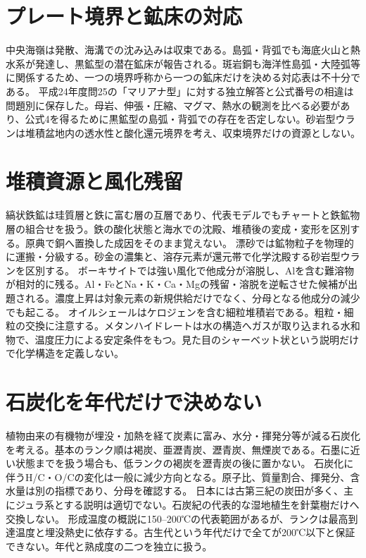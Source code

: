 \section{プレート境界と鉱床の対応}\label{theory:ore:tectonic}
中央海嶺は発散、海溝での沈み込みは収束である\cite{usgs_plate_boundaries}。島弧・背弧でも海底火山と熱水系が発達し、黒鉱型の潜在鉱床が報告される\cite{ore50_backarc_ref}。斑岩銅も海洋性島弧・大陸弧等に関係するため、一つの境界呼称から一つの鉱床だけを決める対応表は不十分である。
平成24年度問25の「マリアナ型」に対する独立解答と公式番号の相違は問題別に保存した。母岩、伸張・圧縮、マグマ、熱水の観測を比べる必要があり、公式4を得るために黒鉱型の島弧・背弧での存在を否定しない。砂岩型ウランは堆積盆地内の透水性と酸化還元境界を考え、収束境界だけの資源としない。

\section{堆積資源と風化残留}\label{theory:ore:sedimentary}
縞状鉄鉱は珪質層と鉄に富む層の互層であり、代表モデルでもチャートと鉄鉱物層の組合せを扱う\cite{ore50_bif_ref}。鉄の酸化状態と海水での沈殿、堆積後の変成・変形を区別する。原典で銅へ置換した成因をそのまま覚えない。
漂砂では鉱物粒子を物理的に運搬・分級する。砂金の濃集と、溶存元素が還元帯で化学沈殿する砂岩型ウランを区別する。
ボーキサイトでは強い風化で他成分が溶脱し、Alを含む難溶物が相対的に残る\cite{ore50_bauxite_ref}。Al・FeとNa・K・Ca・Mgの残留・溶脱を逆転させた候補が出題される。濃度上昇は対象元素の新規供給だけでなく、分母となる他成分の減少でも起こる。
オイルシェールはケロジェンを含む細粒堆積岩である\cite{ore50_oilshale_ref}。粗粒・細粒の交換に注意する。メタンハイドレートは水の構造へガスが取り込まれる水和物で、温度圧力による安定条件をもつ。見た目のシャーベット状という説明だけで化学構造を定義しない。

\section{石炭化を年代だけで決めない}\label{theory:ore:coal}
植物由来の有機物が埋没・加熱を経て炭素に富み、水分・揮発分等が減る石炭化を考える。基本のランク順は褐炭、亜瀝青炭、瀝青炭、無煙炭である\cite{ore50_coal_ref}。石墨に近い状態までを扱う場合も、低ランクの褐炭を瀝青炭の後に置かない。
石炭化に伴うH/C・O/Cの変化は一般に減少方向となる。原子比、質量割合、揮発分、含水量は別の指標であり、分母を確認する。
日本には古第三紀の炭田が多く、主にジュラ系とする説明は適切でない\cite{ore50_japan_coal_ref}。石炭紀の代表的な湿地植生を針葉樹だけへ交換しない。
形成温度の概説に150--200℃の代表範囲があるが、ランクは最高到達温度と埋没熱史に依存する\cite{ore50_coal_temp_ref}。古生代という年代だけで全てが200℃以下と保証できない。年代と熟成度の二つを独立に扱う。

